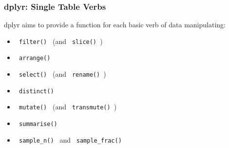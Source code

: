 \documentclass{beamer}
\begin{document}
	\begin{frame}
		\frametitle{dplyr: Single Table Verbs}
		dplyr aims to provide a function for each basic verb of data manipulating:
		{
			\large
		\begin{itemize}
			\item \texttt{ filter() } (and \texttt{  slice() })
			\item \texttt{ arrange() }
			\item \texttt{ select() } (and \texttt{  rename() })
			\item \texttt{ distinct() }
			\item \texttt{ mutate() } (and \texttt{  transmute() })
			\item \texttt{ summarise() }
			\item \texttt{ sample\_n() } and \texttt{  sample\_frac() }
		\end{itemize}
	}
	\end{frame}
	
\end{document}
